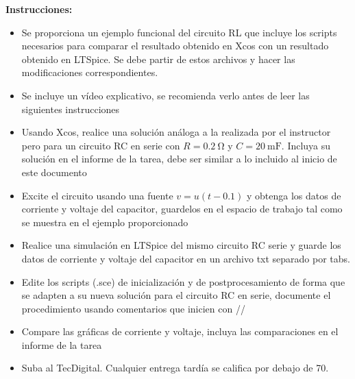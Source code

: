 \documentclass[12pt]{article}
\begin{document}
\noindent\textbf{Instrucciones:}
\begin{itemize}
    \item Se proporciona un ejemplo funcional del circuito RL que incluye los scripts necesarios para comparar el resultado obtenido en Xcos con un resultado obtenido en LTSpice. Se debe partir de estos archivos y hacer las modificaciones correspondientes. 
    \item Se incluye un vídeo explicativo, se recomienda verlo antes de leer las siguientes instrucciones
    \item Usando Xcos, realice una solución análoga a la realizada por el instructor pero para un circuito RC en serie con $R=\SI{0.2}{\ohm}$ y $C=\SI{20}{\milli\farad}$. Incluya su solución en el informe de la tarea, debe ser similar a lo incluido al inicio de este documento 
    \item Excite el circuito usando una fuente $v=u(t-0.1)$ y obtenga los datos de corriente y voltaje del capacitor, guardelos en el espacio de trabajo tal como se muestra en el ejemplo proporcionado
    \item Realice una simulación en LTSpice del mismo circuito RC serie y guarde los datos de corriente y voltaje del capacitor en un archivo txt separado por tabs.
    \item Edite los scripts (.sce) de inicialización y de postprocesamiento de forma que se adapten a su nueva solución para el circuito RC en serie, documente el procedimiento usando comentarios que inicien con //
    \item Compare las gráficas de corriente y voltaje, incluya las comparaciones en el informe de la tarea
    \item Suba al TecDigital. Cualquier entrega tardía se califica por debajo de 70. 
\end{itemize}
\end{document}
